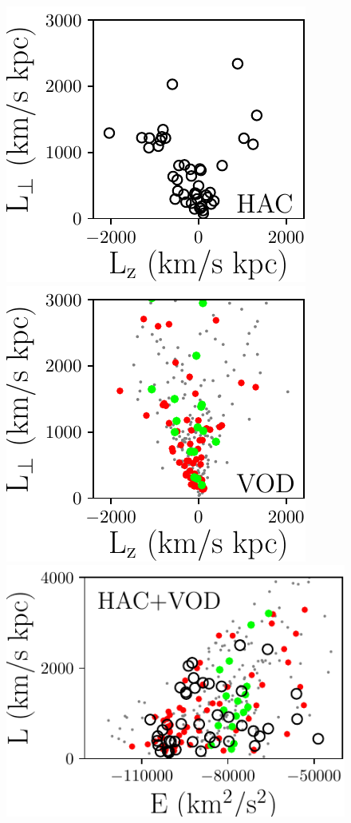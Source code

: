 \documentclass[fleqn,usenatbib]{mnras}
\begin{document}
   \begin{figure}
	        \includegraphics[scale=0.40352]{HAC_Lz_Lp_new.pdf}
	    \includegraphics[scale=0.40352]{VOD_Lz_Lp_new.pdf}
        \includegraphics[scale=0.40352]{E_L_new.pdf}

\end{figure}
\end{document}
